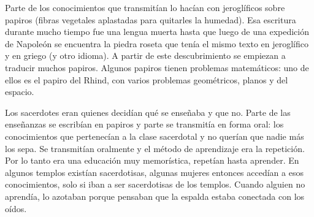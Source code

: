 Parte de los conocimientos que transmitían lo hacían con jeroglíficos sobre papiros (fibras vegetales aplastadas para quitarles la humedad). Esa escritura durante mucho tiempo fue una lengua muerta hasta que luego de una expedición de Napoleón se encuentra la piedra roseta que tenía el mismo texto en jeroglífico y en griego (y otro idioma). A partir de este descubrimiento se empiezan a traducir muchos papiros. Algunos papiros tienen problemas matemáticos: uno de ellos es el papiro del Rhind, con varios problemas geométricos, planos y del espacio.

Los sacerdotes eran quienes decidían qué se enseñaba y que no. Parte de las enseñanzas se escribían en papiros y parte se transmitía en forma oral: los conocimientos que pertenecían a la clase sacerdotal y no querían que nadie más los sepa. Se transmitían oralmente y el método de aprendizaje era la repetición. Por lo tanto era una educación muy memorística, repetían hasta aprender. En algunos templos existían sacerdotisas, algunas mujeres entonces accedían a esos conocimientos, solo si iban a ser sacerdotisas de los templos. Cuando alguien no aprendía, lo azotaban porque pensaban que la espalda estaba conectada con los oídos.